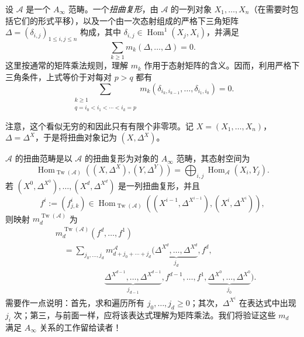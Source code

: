 \begin{definition}\label{def:8.16}
设 $\mathcal A$ 是一个 $A_\infty$ 范畴。一个\emph{扭曲复形}，由 $\mathcal A$ 的一列对象 $X_1,\ldots,X_n$（在需要时包括它们的形式平移），以及一个由一次态射组成的严格下三角矩阵 $\Delta=(\delta_{i,j})_{1\leq i,j\leq n}$ 构成，其中 $\delta_{i,j}\in\operatorname{Hom}^1(X_j,X_i)$，并满足
\[
\sum_{k\geq1}m_k(\Delta,\ldots,\Delta)=0.
\]
这里按通常的矩阵乘法规则，理解 $m_k$ 作用于态射矩阵的含义。因而，利用严格下三角条件，上式等价于对每对 $p>q$ 都有
\[
\sum_{\substack{k\geq1\\q=i_0<i_1<\cdots<i_k=p}}
m_k(\delta_{i_k,i_{k-1}},\ldots,\delta_{i_1,i_0})=0.
\]

注意，这个看似无穷的和因此只有有限个非零项。记 $X=(X_1,\ldots,X_n)$，$\Delta=\Delta^X$，于是将扭曲对象记为 $(X,\Delta^X)$。
\end{definition}

$\mathcal A$ 的扭曲范畴是以 $\mathcal A$ 的扭曲复形为对象的 $A_\infty$ 范畴，其态射空间为
\[
\operatorname{Hom}_{\operatorname{Tw}(\mathcal A)}((X,\Delta^X),(Y,\Delta^Y))
=\bigoplus_{i,j}\operatorname{Hom}_{\mathcal A}(X_i,Y_j).
\]
若 $(X^0,\Delta^{X^0}),\ldots,(X^d,\Delta^{X^d})$ 是一列扭曲复形，并且
\[
f^i:=(f_{j,k}^i)\in\operatorname{Hom}_{\operatorname{Tw}(\mathcal A)}
((X^{i-1},\Delta^{X^{i-1}}),(X^i,\Delta^{X^i})),
\]
则映射 $m_d^{\operatorname{Tw}(\mathcal A)}$ 为
\[
\begin{aligned}
&m_d^{\operatorname{Tw}(\mathcal A)}(f^d,\ldots,f^1)\\
&\quad=\sum_{j_0,\ldots,j_d}
m_{d+j_0+\cdots+j_d}^{\mathcal A}\bigl(
\underbrace{\Delta^{X^d},\ldots,\Delta^{X^d}}_{j_d},f^d,\\
&\hspace{6em}
\underbrace{\Delta^{X^{d-1}},\ldots,\Delta^{X^{d-1}}}_{j_{d-1}},
f^{d-1},\ldots,f^1,
\underbrace{\Delta^{X^0},\ldots,\Delta^{X^0}}_{j_0}\bigr).
\end{aligned}
\]
需要作一点说明：首先，求和遍历所有 $j_0,\ldots,j_d\geq0$；其次，$\Delta^{X^i}$ 在表达式中出现 $j_i$ 次；第三，与前面一样，应将该表达式理解为矩阵乘法。我们将验证这些 $m_d$ 满足 $A_\infty$ 关系的工作留给读者！

